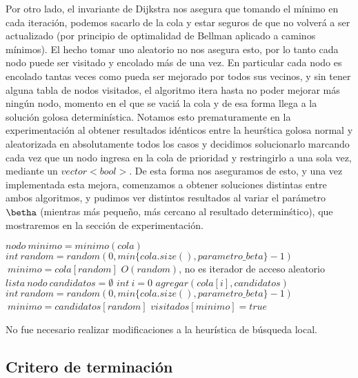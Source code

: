 Por otro lado, el invariante de Dijkstra nos asegura que tomando el mínimo en cada iteraci\'on, podemos sacarlo de la cola y estar seguros de que no volverá a ser actualizado (por principio de optimalidad de Bellman aplicado a caminos m\'inimos). El hecho tomar uno aleatorio no nos asegura esto, por lo tanto cada nodo puede ser visitado y encolado más de una vez. En particular cada nodo es encolado tantas veces como pueda ser mejorado por todos sus vecinos, y sin tener alguna tabla de nodos visitados, el algoritmo itera hasta no poder mejorar m\'as ning\'un nodo, momento en el que se vaci\'a la cola y de esa forma llega a la soluci\'on golosa determin\'istica. Notamos esto prematuramente en la experimentaci\'on al obtener resultados id\'enticos entre la heur\'stica golosa normal y aleatorizada en absolutamente todos los casos y decidimos solucionarlo marcando cada vez que un nodo ingresa en la cola de prioridad y restringirlo a una sola vez, mediante un $vector<bool>$. De esta forma nos aseguramos de esto, y una vez implementada esta mejora, comenzamos a obtener soluciones distintas entre ambos algoritmos, y pudimos ver distintos resultados al variar el par\'ametro $\betha$ (mientras m\'as pequeño, m\'as cercano al resultado determin\'stico), que mostraremos en la secci\'on de experimentaci\'on.
\begin{algorithmic}

    	 \State $nodo \: minimo = minimo(cola)$    
		\State $int \: random = random(0, min\{cola.size(), parametro\_beta\} -1)$
		\State $ \: minimo = cola[random]$
		\Comment $O(random)$, no es iterador de acceso aleatorio
		\State $lista \: nodo \: candidatos = \emptyset$
		\State $int \: i = 0$
				\State $ agregar(cola[i], candidatos) $
			\EndIf
		\EndWhile
		\State $int \: random = random(0, min\{cola.size(), parametro\_beta\} -1)$
		\State $ \: minimo = candidatos[random]$
		\State $visitados[minimo] = true$
		\EndIf
		
\EndWhile
\end{algorithmic}

\vspace{2mm}

No fue necesario realizar modificaciones a la heur\'istica de b\'usqueda local.

\subsection{Critero de terminaci\'on}

